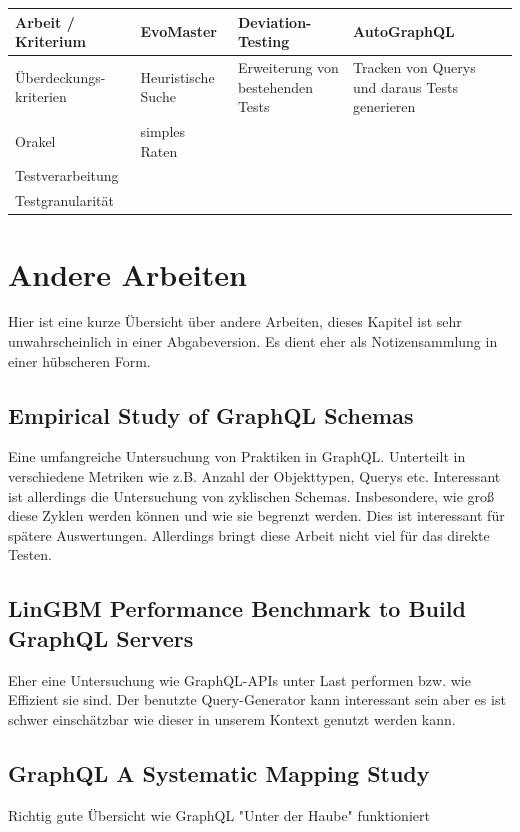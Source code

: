 \begin{center}
    \begin{table}[!ht]
        \begin{tabularx}{\textwidth}{|C|C|C|C|C|}
            \hline
            \textbf{ Arbeit / Kriterium} &  \textbf{EvoMaster} & \textbf{Deviation-Testing} & \textbf{AutoGraphQL} \\
            \hline
            Überdeckungs- kriterien & Heuristische Suche & Erweiterung von bestehenden Tests & Tracken von Querys und daraus Tests generieren \\
            \hline
            Orakel & simples Raten &  & \\
            \hline
            Testverarbeitung & & & \\
            \hline
            Testgranularität & & & \\
            \hline
        \end{tabularx}
    \end{table}
\end{center}

\section{Andere Arbeiten}
Hier ist eine kurze Übersicht über andere Arbeiten, dieses Kapitel ist sehr unwahrscheinlich in einer Abgabeversion.
Es dient eher als Notizensammlung in einer hübscheren Form.

\subsection{Empirical Study of GraphQL Schemas}
Eine umfangreiche Untersuchung von Praktiken in GraphQL. Unterteilt in verschiedene Metriken wie z.B.
Anzahl der Objekttypen, Querys etc.
Interessant ist allerdings die Untersuchung von zyklischen Schemas. Insbesondere, wie groß diese Zyklen
werden können und wie sie begrenzt werden. Dies ist interessant für spätere Auswertungen. Allerdings bringt
diese Arbeit nicht viel für das direkte Testen.

\subsection{LinGBM Performance Benchmark to Build GraphQL Servers}
Eher eine Untersuchung wie GraphQL-APIs unter Last performen bzw. wie Effizient sie sind.
Der benutzte Query-Generator kann interessant sein aber es ist schwer einschätzbar wie dieser in unserem Kontext genutzt werden
kann.

\subsection{GraphQL A Systematic Mapping Study}
Richtig gute Übersicht wie GraphQL "Unter der Haube" funktioniert


